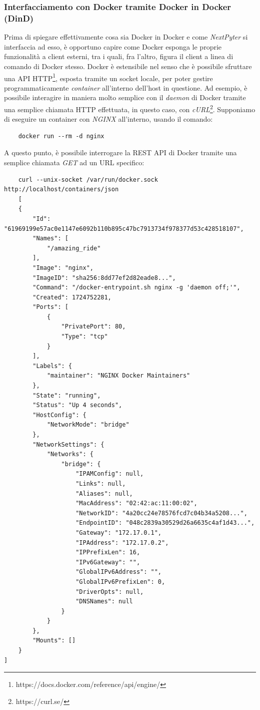 \subsubsection{Interfacciamento con Docker tramite Docker in Docker (DinD)}
Prima di spiegare effettivamente cosa sia Docker in Docker e come \textit{NextPyter} si interfaccia ad esso, è opportuno capire come Docker esponga le proprie funzionalità a client esterni, tra i quali, fra l'altro, figura il client a linea di comando di Docker stesso.
\newline
Docker è estensibile nel senso che è possibile sfruttare una API HTTP\footnote{https://docs.docker.com/reference/api/engine/}, esposta tramite un socket locale, per poter gestire programmaticamente \textit{container} all'interno dell'host in questione.
\newline
Ad esempio, è possibile interagire in maniera molto semplice con il \textit{daemon} di Docker tramite una semplice chiamata HTTP effettuata, in questo caso, con \textit{cURL}\footnote{https://curl.se/}.
\newline
Supponiamo di eseguire un container con \textit{NGINX} all'interno, usando il comando:
\begin{verbatim}
    docker run --rm -d nginx
\end{verbatim}
A questo punto, è possibile interrogare la REST API di Docker tramite una semplice chiamata \textit{GET} ad un URL specifico:
\begin{verbatim}
    curl --unix-socket /var/run/docker.sock http://localhost/containers/json
    [
    {
        "Id": "61969199e57ac0e1147e6092b110b895c47bc7913734f978377d53c428518107",
        "Names": [
            "/amazing_ride"
        ],
        "Image": "nginx",
        "ImageID": "sha256:8dd77ef2d82eade8...",
        "Command": "/docker-entrypoint.sh nginx -g 'daemon off;'",
        "Created": 1724752281,
        "Ports": [
            {
                "PrivatePort": 80,
                "Type": "tcp"
            }
        ],
        "Labels": {
            "maintainer": "NGINX Docker Maintainers"
        },
        "State": "running",
        "Status": "Up 4 seconds",
        "HostConfig": {
            "NetworkMode": "bridge"
        },
        "NetworkSettings": {
            "Networks": {
                "bridge": {
                    "IPAMConfig": null,
                    "Links": null,
                    "Aliases": null,
                    "MacAddress": "02:42:ac:11:00:02",
                    "NetworkID": "4a20cc24e78576fcd7c04b34a5208...",
                    "EndpointID": "048c2839a30529d26a6635c4af1d43...",
                    "Gateway": "172.17.0.1",
                    "IPAddress": "172.17.0.2",
                    "IPPrefixLen": 16,
                    "IPv6Gateway": "",
                    "GlobalIPv6Address": "",
                    "GlobalIPv6PrefixLen": 0,
                    "DriverOpts": null,
                    "DNSNames": null
                }
            }
        },
        "Mounts": []
    }
]
\end{verbatim}
